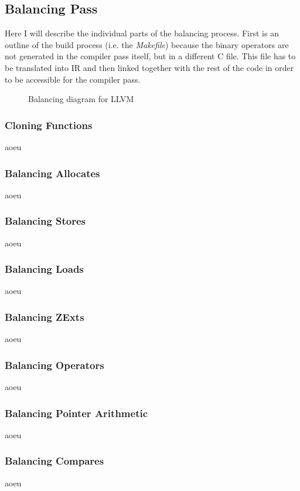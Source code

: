 
\subsection{Balancing Pass}
Here I will describe the individual parts of the balancing process.
First is an outline of the build process (i.e. the \emph{Makefile}) because the binary operators are not generated in the compiler pass itself, but in a different C file.
This file has to be translated into \llvm{} IR and then linked together with the rest of the code in order to be accessible for the compiler pass.

\begin{figure}[h]
  \caption{Balancing diagram for LLVM}
\end{figure}

\subsubsection{Cloning Functions}
aoeu

\subsubsection{Balancing Allocates}
aoeu

\subsubsection{Balancing Stores}
aoeu

\subsubsection{Balancing Loads}
aoeu

\subsubsection{Balancing ZExts}
aoeu

\subsubsection{Balancing Operators}
aoeu

\subsubsection{Balancing Pointer Arithmetic}
aoeu

\subsubsection{Balancing Compares}
aoeu
